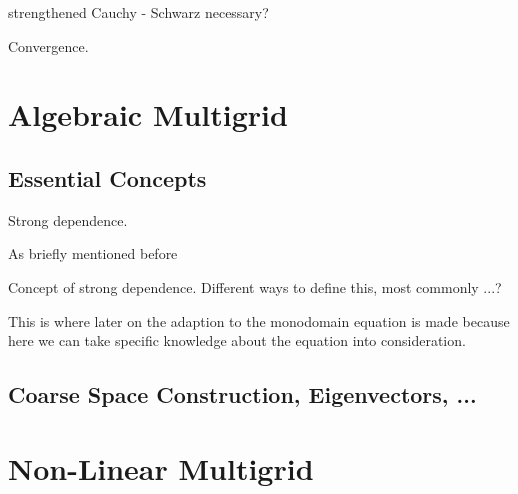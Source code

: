 \documentclass[../draft_1.tex]{subfiles}
\begin{document}
strengthened Cauchy - Schwarz necessary?


\begin{Theorem}
	Convergence.
\end{Theorem}

\section{Algebraic Multigrid}

\subsection{Essential Concepts}


\begin{Definition}
	Strong dependence.
\end{Definition}

As briefly mentioned before 

Concept of strong dependence. Different ways to define this, most commonly ...? 

This is where later on the adaption to the monodomain equation is made because here we can take specific knowledge about the equation into consideration. 

\subsection{Coarse Space Construction, Eigenvectors, ...}

\section{Non-Linear Multigrid}
\end{document}
